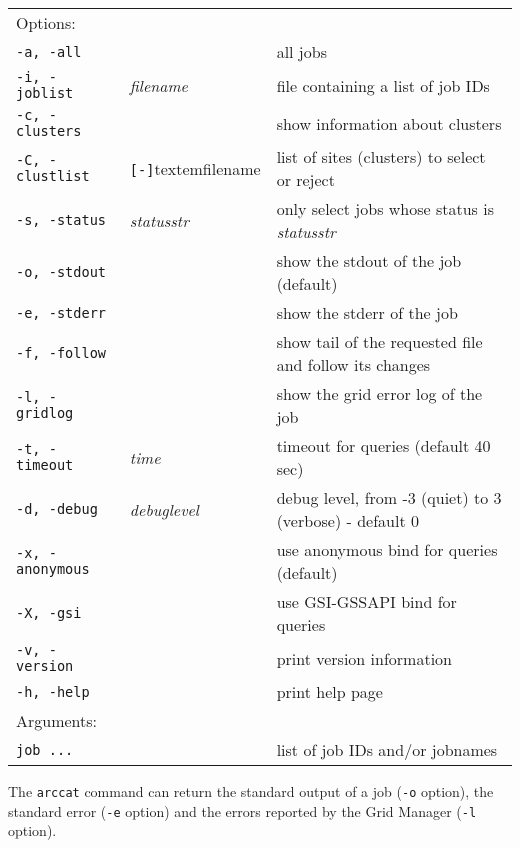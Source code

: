 \hspace*{0.5cm}
\begin{shaded}
\end{shaded}
\begin{longtable}{llp{8cm}}
   Options:&&\\
   \texttt{-a, -all}& & all jobs\\
   \texttt{-i, -joblist}& \textit{filename} & file containing a list of job IDs\\
   \texttt{-c, -clusters}& & show information about clusters\\
   \texttt{-C, -clustlist}&\verb#[-]#textem{filename}&list of sites (clusters) to select or reject\\
   \texttt{-s, -status}& \textit{statusstr} &only select jobs whose status is \textit{statusstr}\\
   \texttt{-o, -stdout}& & show the stdout of the job (default)\\
   \texttt{-e, -stderr}& & show the stderr of the job\\
   \texttt{-f, -follow}& & show tail of the requested file and follow its changes\\
   \texttt{-l, -gridlog}& & show the grid error log of the job\\
   \texttt{-t, -timeout}& \textit{time} & timeout for queries (default 40 sec)\\
   \texttt{-d, -debug}& \textit{debuglevel} &debug level, from -3 (quiet) to 3 (verbose) - default 0\\
   \texttt{-x, -anonymous}& & use anonymous bind for queries (default)\\
   \texttt{-X, -gsi}& & use GSI-GSSAPI bind for queries\\
   \texttt{-v, -version}& & print version information\\
   \texttt{-h, -help}& & print help page\\
   Arguments:&&\\
   \texttt{job ...} && list of job IDs and/or jobnames\\
\end{longtable}

The \texttt{arccat} command can return the standard output of a job
(\texttt{-o} option), the standard error (\texttt{-e} option) and the
errors reported by the Grid Manager (\texttt{-l} option).

\begin{framed}

\end{framed}


